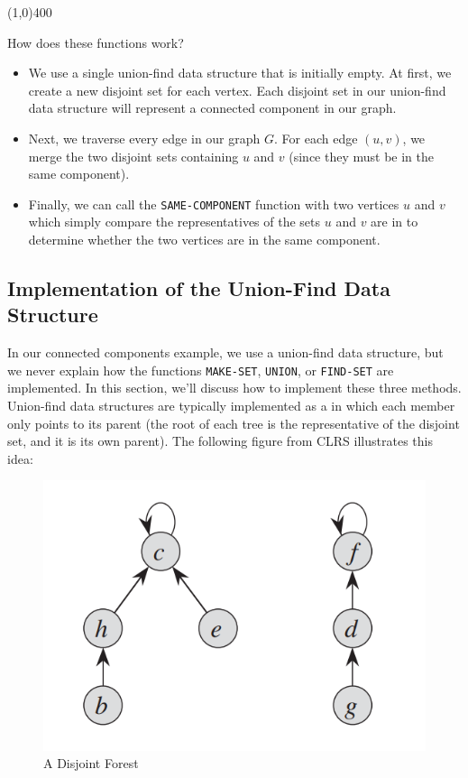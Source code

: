 \begin{center}
\line(1,0){400}
\end{center}


How does these functions work?

\begin{itemize}
    \item We use a single union-find data structure that is initially empty. At first, we create a new disjoint set for each vertex. Each disjoint set in our union-find data structure will represent a connected component in our graph.
    \item Next, we traverse every edge in our graph $G$. For each edge $(u, v)$, we merge the two disjoint sets containing $u$ and $v$ (since they must be in the same component). 
    \item Finally, we can call the \verb!SAME-COMPONENT! function with two vertices $u$ and $v$ which simply compare the representatives of the sets $u$ and $v$ are in to determine whether the two vertices are in the same component.
\end{itemize}

\subsection{Implementation of the Union-Find Data Structure}

In our connected components example, we use a union-find data structure, but we never explain how the functions \verb!MAKE-SET!, \verb!UNION!, or \verb!FIND-SET! are implemented. In this section, we'll discuss how to implement these three methods. \\

Union-find data structures are typically implemented as a  in which each member only points to its parent (the root of each tree is the representative of the disjoint set, and it is its own parent). The following figure from CLRS illustrates this idea:


\begin{figure}[h]
\centering
\includegraphics[scale=0.4]{media/ufds1}
\caption{A Disjoint Forest}
\end{figure}

